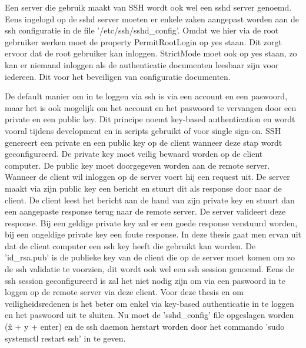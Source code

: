         Een server die gebruik maakt van SSH wordt ook wel een sshd server genoemd. Eens ingelogd op de sshd server moeten er enkele zaken aangepast worden aan de ssh configuratie in de file '/etc/ssh/sshd\_config'. Omdat we hier via de root gebruiker werken moet de property PermitRootLogin op yes staan. Dit zorgt ervoor dat de root gebruiker kan inloggen.
        StrictMode moet ook op yes staan, zo kan er niemand inloggen als de authenticatie documenten leesbaar zijn voor iedereen. Dit voor het beveiligen van configuratie documenten. %
        
        De default manier om in te loggen via ssh is via een account en een paswoord, maar het is ook mogelijk om het account en het paswoord te vervangen door een private en een public key. Dit principe noemt key-based authentication en wordt vooral tijdens development en in scripts gebruikt of voor single sign-on. SSH genereert een private en een public key op de client wanneer deze stap wordt geconfigureerd. De private key moet veilig bewaard worden op de client computer. De public key moet doorgegeven worden aan de remote server. Wanneer de client wil inloggen op de server voert hij een request uit. De server maakt via zijn public key een bericht en stuurt dit als response door naar de client. De client leest het bericht aan de hand van zijn private key en stuurt dan een aangepaste response terug naar de remote server. De server valideert deze response. Bij een geldige private key zal er een goede response verstuurd worden, bij een ongeldige private key een foute response.
        In deze thesis gaat men ervan uit dat de client computer een ssh key heeft die gebruikt kan worden. %
        De 'id\_rsa.pub' is de publieke key van de client die op de server moet komen om zo de ssh validatie te voorzien, dit wordt ook wel een ssh session genoemd. Eens de ssh session geconfigureerd is zal het niet nodig zijn om via een paswoord in te loggen op de remote server via deze client.
        Voor deze thesis en om veiligheidsredenen is het beter om enkel via key-based authenticatie in te loggen en het paswoord uit te sluiten.
        Nu moet de 'sshd\_config' file opgeslagen worden (\^x + y + enter) en de ssh daemon herstart worden door het commando 'sudo systemctl restart ssh' in te geven.
        
